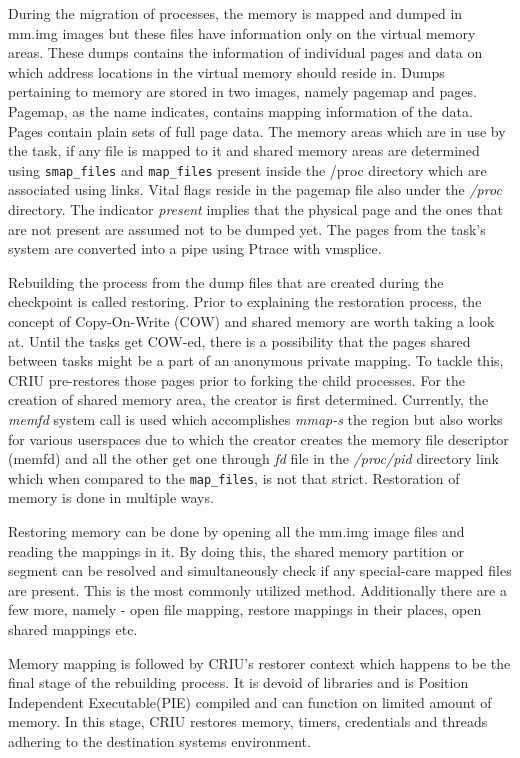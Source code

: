 \documentclass[conference]{IEEEtran}
\begin{document}
During the migration of processes, the memory is mapped and dumped in mm.img images but these files have information only on the virtual memory areas. These dumps contains the information of individual pages and data on which address locations in the virtual memory should reside in. Dumps pertaining to memory are stored in two images, namely pagemap and pages. Pagemap, as the name indicates, contains mapping information of the data. Pages contain plain sets of full page data. The memory areas which are in use by the task, if any file is mapped to it and shared memory areas are determined using \verb|smap_files| and \verb|map_files| present inside the /proc directory which are associated using links. Vital flags reside in the pagemap file also under the \emph{/proc} directory. The indicator \emph{present} implies that the physical page and the ones that are not present are assumed not to be dumped yet. The pages from the task's system are converted into a pipe using Ptrace with vmsplice. 

Rebuilding the process from the dump files that are created during the checkpoint is called restoring. Prior to explaining the restoration process, the concept of Copy-On-Write (COW) and shared memory are worth taking a look at. Until the tasks get COW-ed, there is a possibility that the pages shared between tasks might be a part of an anonymous private mapping. To tackle this, CRIU pre-restores those pages prior to forking the child processes. For the creation of shared memory area, the creator is first determined. Currently, the \emph{memfd} system call is used which accomplishes \emph{mmap-s} the region but also works for various userspaces due to which the creator creates the memory file descriptor (memfd) and all the other get one through \emph{fd} file in the \emph{/proc/pid} directory link which when compared to the \verb|map_files|, is not that strict. Restoration of memory is done in multiple ways.

Restoring memory can be done by opening all the mm.img image files and reading the mappings in it. By doing this, the shared memory partition or segment can be resolved and simultaneously check if any special-care mapped files are present. This is the most commonly utilized method. Additionally there are a few more, namely - open file mapping, restore mappings in their places, open shared mappings etc.

Memory mapping is followed by CRIU's restorer context which happens to be the final stage of the rebuilding process. It is devoid of libraries and is Position Independent Executable(PIE) compiled and can function on limited amount of memory. In this stage, CRIU restores memory, timers, credentials and threads adhering to the destination systems environment.
\end{document}
